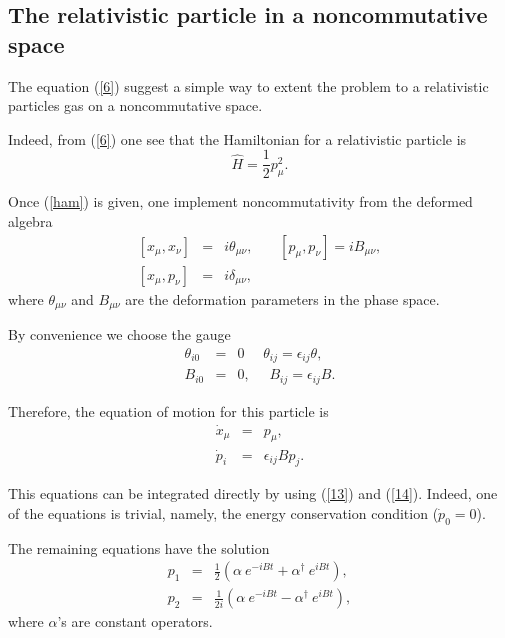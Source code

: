 \documentclass[a4paper,aps,twocolumn,amsfonts]{revtex4}
\begin{document}
   \subsection{The relativistic particle in a noncommutative space}

   The equation (\ref{6}) suggest a simple way to extent the problem to a relativistic particles gas on a noncommutative space.

   Indeed,  from (\ref{6}) one see that the Hamiltonian for a relativistic particle is
   \begin{equation}
   {\hat H} =\frac{1}{2} p^2_\mu.  \label{ham}
   \end{equation}

   Once (\ref{ham}) is given, one implement noncommutativity from the deformed algebra
   \begin{eqnarray}
   \left[ x_\mu, x_\nu\right] &=& i \theta_{\mu \nu},
   \,\,\,\,\,\,\,\,\,\,\, \left[ p_\mu, p_\nu\right] = i B_{\mu \nu}, \label{11}
   \\
   \left[ x_\mu, p_\nu\right] &=& i \delta_{\mu \nu}, \label{12}
   \end{eqnarray}
   where $\theta_{\mu \nu}$ and  $B_{\mu \nu}$ are the deformation parameters in the phase space.

   By convenience  we choose the gauge
   \begin{eqnarray}
   \theta_{i0} &=& 0\, \, \, \,\, \, \, \,  \theta_{ij} = \epsilon_{ij}
   \theta, \label{13}
   \\
   B_{i0} &=& 0, \, \, \, \,\, \, \, \, B_{ij} = \epsilon_{ij}  B.
   \label{14}
   \end{eqnarray}

   Therefore, the equation of motion for this particle is
   \begin{eqnarray}
   {\dot x}_\mu &=& p_\mu, \nonumber
   \\
   {\dot p}_i &=&  \epsilon_{ij} B p_j.  \label{15}
   \end{eqnarray}

   This equations can be integrated directly by using (\ref{13}) and (\ref{14}). Indeed, one of the equations is trivial, namely, the energy conservation condition ($\dot{p}_0=0$).

   The remaining equations have the solution
   \begin{eqnarray}
   p_1 &=& \frac{1}{2} \left( \alpha~ e^{-i B t} + \alpha^\dag ~ e^{ i B t}
   \right), \nonumber
   \\
   p_2 &=& \frac{1}{2i} \left( \alpha ~e^{- i B t} - \alpha^\dag~ e^{ i B
   t} \right), \label{16}
   \end{eqnarray}
   where  $\alpha$'s are constant operators.
\end{document}
